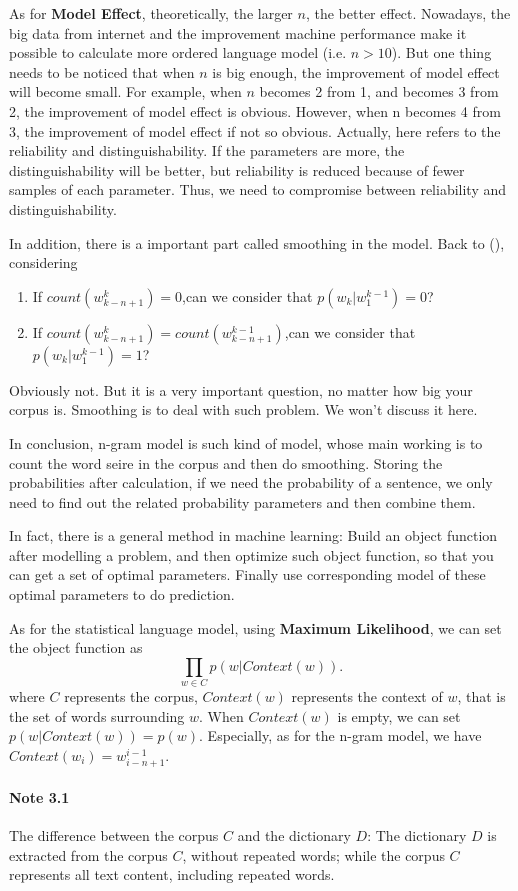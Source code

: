 As for \textbf{Model Effect}, theoretically, the larger $n$, the better effect. Nowadays, the big data from internet and the improvement machine performance make it possible to calculate more ordered language model (i.e. $n > 10$). But one thing needs to be noticed that when $n$ is big enough, the improvement of model effect will become small. For example, when $n$ becomes 2 from 1, and becomes 3 from 2, the improvement of model effect is obvious. However, when n becomes 4 from 3, the improvement of model effect if not so obvious. Actually, here refers to the reliability and distinguishability. If the parameters are more, the distinguishability will be better, but reliability is reduced because of fewer samples of each parameter. Thus, we need to compromise between reliability and distinguishability. 

In addition, there is a important part called smoothing in the model. Back to (), considering
\begin{enumerate}
\item If $count(w^k_{k-n+1})=0$,can we consider that $p(w_k|w^{k-1}_1) = 0$?
\item If $count(w^k_{k-n+1})=count(w^{k-1}_{k-n+1})$,can we consider that $p(w_k|w^{k-1}_1)=1$?
\end{enumerate}
Obviously not. But it is a very important question, no matter how big your corpus is. Smoothing is to deal with such problem. We won't discuss it here.

In conclusion, n-gram model is such kind of model, whose main working is to count the word seire in the corpus and then do smoothing. Storing the probabilities after calculation, if we need the probability of a sentence, we only need to find out the related probability parameters and then combine them.

In fact, there is a general method in machine learning: Build an object function after modelling a problem, and then optimize such object function, so that you can get a set of optimal parameters. Finally use corresponding model of these optimal parameters to do prediction. 

As for the statistical language model, using \textbf{Maximum Likelihood}, we can set the object function as 
$$\prod_{w\in C}p(w|Context(w)).$$
where $C$ represents the corpus, $Context(w)$ represents the context of  $w$, that is the set of words surrounding $w$. When $Context(w)$ is empty, we can set $p(w|Context(w))=p(w)$. Especially, as for the n-gram model, we have $Context(w_i)=w^{i-1}_{i-n+1}.$
\paragraph{Note 3.1} The difference between the corpus $C$ and the dictionary $D$:  The dictionary $D$ is extracted from the corpus $C$, without repeated words; while the corpus $C$ represents all text content, including repeated words.\\

